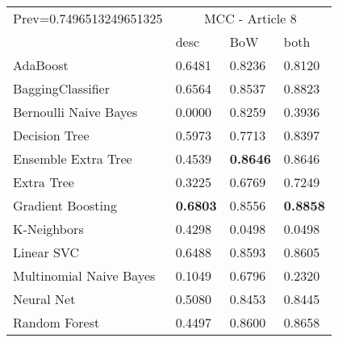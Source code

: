 \begin{tabular}{|l|l|l|l| }
\hline
Prev=0.7496513249651325 &  \multicolumn{3}{c|}{MCC - Article 8} \\
\cline{2-4} & desc & BoW & both \\ \hline
AdaBoost                & 0.6481 & 0.8236 & 0.8120\\
BaggingClassifier       & 0.6564 & 0.8537 & 0.8823\\
Bernoulli Naive Bayes   & 0.0000 & 0.8259 & 0.3936\\
Decision Tree           & 0.5973 & 0.7713 & 0.8397\\
Ensemble Extra Tree     & 0.4539 & {\bf 0.8646} & 0.8646\\
Extra Tree              & 0.3225 & 0.6769 & 0.7249\\
Gradient Boosting       & {\bf 0.6803} & 0.8556 & {\bf 0.8858}\\
K-Neighbors             & 0.4298 & 0.0498 & 0.0498\\
Linear SVC              & 0.6488 & 0.8593 & 0.8605\\
Multinomial Naive Bayes & 0.1049 & 0.6796 & 0.2320\\
Neural Net              & 0.5080 & 0.8453 & 0.8445\\
Random Forest           & 0.4497 & 0.8600 & 0.8658\\
\hline
\end{tabular}